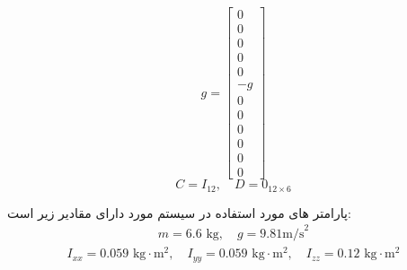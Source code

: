 \begin{equation}
	g =
	\begin{bmatrix}
		0 \\ 0 \\ 0 \\ 0 \\ 0 \\ -g \\ 0 \\ 0 \\ 0 \\ 0 \\ 0 \\ 0
	\end{bmatrix}
	\label{eq:method-g-vector}
\end{equation}
\begin{equation}
	C = I_{12}, \quad
	D = 0_{12 \times 6}
	\label{eq:method-C-D}
\end{equation}


پارامتر های مورد استفاده در سیستم مورد دارای مقادیر زیر است:
\begin{align}
	m = 6.6 \text{ kg}, \quad g = 9.81 \text{m/s}^2
	\label{eq:method-mass-gravity}
\end{align}
\begin{align}
	I_{xx} = 0.059 \text{ kg}\cdot\text{m}^2, \quad
	I_{yy} = 0.059 \text{ kg}\cdot\text{m}^2, \quad
	I_{zz} = 0.12 \text{ kg}\cdot\text{m}^2
	\label{eq:method-inertia}
\end{align}

